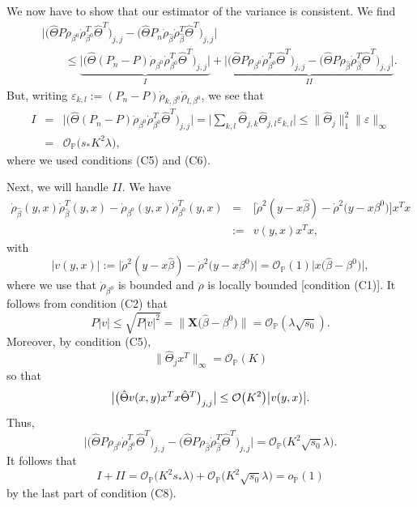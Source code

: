 \documentclass[aos,MSNbibl,dvips]{arximspdf}
\newcommand{\PP}{\mathbb{P}}
\newcommand{\bx}{\mathbf{X}}
\begin{document}
We now have to show that our estimator of the variance is consistent.
We find
%
\begin{eqnarray*}
& &\bigl|\bigl(\hat\Theta P \dot\rho_{ \beta^0 } \dot\rho_{\beta^0}^T
\hat{\Theta}^T \bigr)_{j,j} - \bigl( \hat\Theta
P_n \dot\rho_{\hat\beta} \dot \rho_{\hat\beta}^T
\hat\Theta^T \bigr)_{j,j} \bigr|
\\
&&\qquad\le \underbrace{\bigl| \bigl(\hat\Theta(P_n - P) \dot
\rho_{ \beta^0 } \dot\rho_{\beta^0}^T \hat
\Theta^T \bigr)_{j,j}\bigr |}_{I} + \underbrace{ \bigl|
\bigl(\hat\Theta P \dot\rho_{ \beta^0 } \dot\rho_{\beta^0}^T
\hat \Theta ^T \bigr)_{j,j} - \bigl( \hat\Theta P \dot
\rho_{\hat\beta} \dot\rho_{\hat\beta}^T \hat
\Theta^T \bigr)_{j,j} \bigr| }_{\mathit{II}}.
\end{eqnarray*}
%
But, writing $\varepsilon_{k,l}:= (P_n - P) \dot\rho_{k, \beta^0}
\dot\rho_{l, \beta^0} $, we see
that
%
\begin{eqnarray*}
I &=& \bigl|\bigl( \hat\Theta(P_n - P) \dot\rho_{ \beta^0 } \dot
\rho_{\beta
^0}^T \hat\Theta^T \bigr)_{j,j}\bigr|=
\biggl|\sum_{k,l} \hat\Theta_{j,k} \hat
\Theta_{j,l} \varepsilon_{k,l} \biggr| \le\| \hat
\Theta_j\|_1^2 \| \varepsilon
\|_{\infty}\\
& =& {\mathcal O}_{\PP} \bigl(s_* K^2\lambda
\bigr),
\end{eqnarray*}
%
where we used conditions (C5) and (C6).

Next, we will handle $\mathit{II}$. We have
%
\begin{eqnarray*}
\dot\rho_{\hat\beta} (y,x) \dot\rho_{\hat\beta}^T (y,x)- \dot
\rho _{\beta^0} (y,x) \dot\rho_{\beta^0}^T (y,x) &=& \bigl[
\dot\rho^2( y - x \hat\beta) - \dot\rho^2 \bigl(y - x
\beta^0 \bigr) \bigr] x^T x %
\\
&:=& v (y,x) x^T x, %
\end{eqnarray*}
%
with
%
\[
\bigl| v(y,x)\bigr |:=\bigl | \dot\rho^2( y - x\hat\beta) - \dot\rho^2
\bigl(y- x\beta ^0 \bigr)\bigr| = {\mathcal O}_{\PP} (1)\bigl | x
\bigl( \hat\beta- \beta^0\bigr) \bigr|,
\]
%
where we use that $\dot\rho_{\beta^0} $ is bounded and $\ddot\rho$ is
locally bounded [condition (C1)].
It follows from condition (C2) that
%
\[
P |v | \le\sqrt{P |v|^2} =\bigl\| \bx\bigl( \hat\beta-
\beta^0 \bigr) \bigr\| = {\mathcal O}_{\PP} ( \lambda
\sqrt{s_0}). %
\]
%
Moreover, by condition (C5),
%
\[
\bigl\| \hat\Theta_j x^T \bigr\|_{\infty} = {\mathcal
O}_{\PP} (K ) %
\]
%
so that
%
\[
\bigl| \bigl( \hat\Theta v(x,y) x^T x \hat\Theta^T
\bigr)_{j,j}\bigr | \le{\mathcal O} \bigl(K^2 \bigr) \bigl|v(y,x)\bigr |.\vadjust{\goodbreak}
\]
%
Thus,
%
\[
\bigl| \bigl(\hat\Theta P \dot\rho_{ \beta^0 } \dot\rho_{\beta^0}^T
\hat \Theta ^T \bigr)_{j,j} - \bigl( \hat\Theta P \dot
\rho_{\hat\beta} \dot\rho_{\hat\beta}^T \hat
\Theta^T\bigr)_{j,j}\bigr |= {\mathcal O}_{\PP} \bigl(
K^2 \sqrt{s_0} \lambda\bigr). %
\]
%
It follows that
%
\[
I + \mathit{II} = {\mathcal O}_{\PP} \bigl( K^2 s_* \lambda\bigr) +
{\mathcal O}_{\PP} \bigl( K^2 \sqrt{s_0} \lambda
\bigr) = o_{\PP} (1) %
\]
%
by the last part of condition (C8). %
\end{document}
